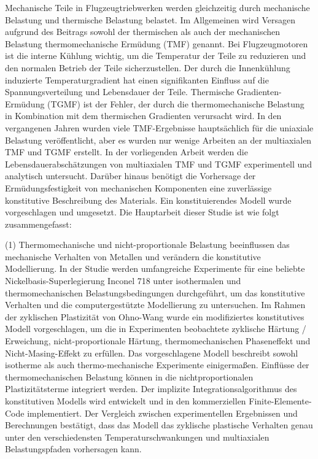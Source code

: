 \noindent
Mechanische Teile in Flugzeugtriebwerken werden gleichzeitig durch mechanische Belastung und thermische Belastung belastet. Im Allgemeinen wird Versagen aufgrund des Beitrags sowohl der thermischen als auch der mechanischen Belastung thermomechanische Ermüdung (TMF) genannt. Bei Flugzeugmotoren ist die interne Kühlung wichtig, um die Temperatur der Teile zu reduzieren und den normalen Betrieb der Teile sicherzustellen. Der durch die Innenkühlung induzierte Temperaturgradient hat einen signifikanten Einfluss auf die Spannungsverteilung und Lebensdauer der Teile. Thermische Gradienten-Ermüdung (TGMF) ist der Fehler, der durch die thermomechanische Belastung in Kombination mit dem thermischen Gradienten verursacht wird. In den vergangenen Jahren wurden viele TMF-Ergebnisse hauptsächlich für die uniaxiale Belastung veröffentlicht, aber es wurden nur wenige Arbeiten an der multiaxialen TMF und TGMF erstellt. In der vorliegenden Arbeit werden die Lebensdauerabschätzungen von multiaxialen TMF und TGMF experimentell und analytisch untersucht. Darüber hinaus benötigt die Vorhersage der Ermüdungsfestigkeit von mechanischen Komponenten eine zuverlässige konstitutive Beschreibung des Materials. Ein konstituierendes Modell wurde vorgeschlagen und umgesetzt. Die Hauptarbeit dieser Studie ist wie folgt zusammengefasst:

(1) Thermomechanische und nicht-proportionale Belastung beeinflussen das mechanische Verhalten von Metallen und verändern die konstitutive Modellierung. In der Studie werden umfangreiche Experimente für eine beliebte Nickelbasis-Superlegierung Inconel 718 unter isothermalen und thermomechanischen Belastungsbedingungen durchgeführt, um das konstitutive Verhalten und die computergestützte Modellierung zu untersuchen. Im Rahmen der zyklischen Plastizität von Ohno-Wang wurde ein modifiziertes konstitutives Modell vorgeschlagen, um die in Experimenten beobachtete zyklische Härtung / Erweichung, nicht-proportionale Härtung, thermomechanischen Phaseneffekt und Nicht-Masing-Effekt zu erfüllen. Das vorgeschlagene Modell beschreibt sowohl isotherme als auch thermo-mechanische Experimente einigermaßen. Einflüsse der thermomechanischen Belastung können in die nichtproportionalen Plastizitätsterme integriert werden. Der implizite Integrationsalgorithmus des konstitutiven Modells wird entwickelt und in den kommerziellen Finite-Elemente-Code implementiert. Der Vergleich zwischen experimentellen Ergebnissen und Berechnungen bestätigt, dass das Modell das zyklische plastische Verhalten genau unter den verschiedensten Temperaturschwankungen und multiaxialen Belastungspfaden vorhersagen kann.

